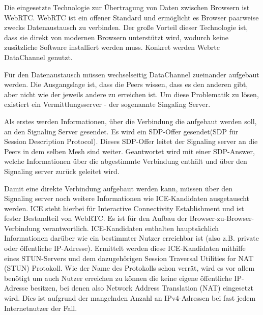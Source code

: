 Die eingesetzte Technologie zur Übertragung von Daten zwischen Browsern ist WebRTC. WebRTC ist ein offener Standard und ermöglicht es Browser paarweise zwecks Datenaustausch zu verbinden. Der große Vorteil dieser Technologie ist, dass sie direkt von modernen Browsern unterstützt wird, wodurch keine zusätzliche Software installiert werden muss. Konkret werden Webrtc DataChannel genutzt.

Für den Datenaustausch müssen wechselseitig DataChannel zueinander aufgebaut werden. Die Ausgangslage ist, dass die Peers wissen, dass es den anderen gibt, aber nicht wie der jeweils andere zu erreichen ist. Um diese Problematik zu lösen, existiert ein Vermittlungsserver - der sogenannte Singaling Server.

Als erstes werden Informationen, über die Verbindung die aufgebaut werden soll, an den Signaling Server gesendet. Es wird ein SDP-Offer gesendet(SDP für Session Description Protocol). Dieses SDP-Offer leitet der Signaling server an die Peers in dem selben Mesh sind weiter. Geantwortet wird mit einer SDP-Answer, welche Informationen über die abgestimmte Verbindung enthält und über den Signaling server zurück geleitet wird.

Damit eine direkte Verbindung aufgebaut werden kann, müssen über den Signaling server noch weitere Informationen wie ICE-Kandidaten ausgetauscht werden. ICE steht hierbei für Interactive Connectivity Establishment und ist fester Bestandteil von WebRTC. Es ist für den Aufbau der Browser-zu-Browser-Verbindung verantwortlich. ICE-Kandidaten enthalten hauptsächlich Informationen darüber wie ein bestimmter Nutzer erreichbar ist (also z.B. private oder öffentliche IP-Adresse). Ermittelt werden diese ICE-Kandidaten mithilfe eines STUN-Servers und dem dazugehörigen Session Traversal Utilities for NAT (STUN) Protokoll. Wie der Name des Protokolls schon verrät, wird es vor allem benötigt um auch Nutzer erreichen zu können die keine eigene öffentliche IP-Adresse besitzen, bei denen also Network Address Translation (NAT) eingesetzt wird. Dies ist aufgrund der mangelnden Anzahl an IPv4-Adressen bei fast jedem Internetnutzer der Fall.

